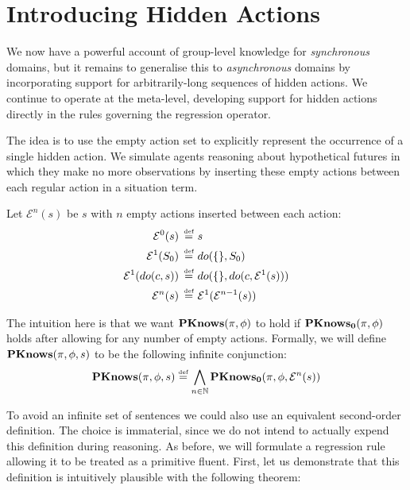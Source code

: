 \section{Introducing Hidden Actions\label{sec:CKnowledge:Asynchronous}}

We now have a powerful account of group-level knowledge for \emph{synchronous}
domains, but it remains to generalise this to \emph{asynchronous}
domains by incorporating support for arbitrarily-long sequences of
hidden actions. We continue to operate at the meta-level, developing
support for hidden actions directly in the rules governing the regression
operator.

The idea is to use the empty action set to explicitly represent the
occurrence of a single hidden action. We simulate agents reasoning
about hypothetical futures in which they make no more observations
by inserting these empty actions between each regular action in a
situation term.

\begin{defn}
Let $\mathcal{E}^{n}(s)$ be $s$ with $n$ empty actions inserted
between each action:\begin{align*}
\mathcal{E}^{0}(s)\,\stackrel{\mbox{\tiny def}}{=}\,\, & s\\
\mathcal{E}^{1}(S_{0})\,\stackrel{\mbox{\tiny def}}{=}\,\, & do(\{\},S_{0})\\
\mathcal{E}^{1}(do(c,s))\,\stackrel{\mbox{\tiny def}}{=}\,\, & do(\{\},do(c,\mathcal{E}^{1}(s)))\\
\mathcal{E}^{n}(s)\,\stackrel{\mbox{\tiny def}}{=}\,\, & \mathcal{E}^{1}(\mathcal{E}^{n-1}(s))\end{align*}

\end{defn}
The intuition here is that we want $\mathbf{PKnows}(\pi,\phi)$ to hold if
$\mathbf{PKnows_{0}}(\pi,\phi)$ holds after allowing for any number of empty
actions. Formally, we will define $\mathbf{PKnows}(\pi,\phi,s)$ to be the
following infinite conjunction:\[
\mathbf{PKnows}(\pi,\phi,s)\stackrel{\mbox{\tiny def}}{=}\bigwedge_{n\in\mathbb{N}}\mathbf{PKnows_{0}}(\pi,\phi,\mathcal{E}^{n}(s))\]


To avoid an infinite set of sentences we could also use an equivalent
second-order definition. The choice is immaterial, since we do not
intend to actually expend this definition during reasoning. As before,
we will formulate a regression rule allowing it to be treated as a
primitive fluent. First, let us demonstrate that this definition is
intuitively plausible with the following theorem:

